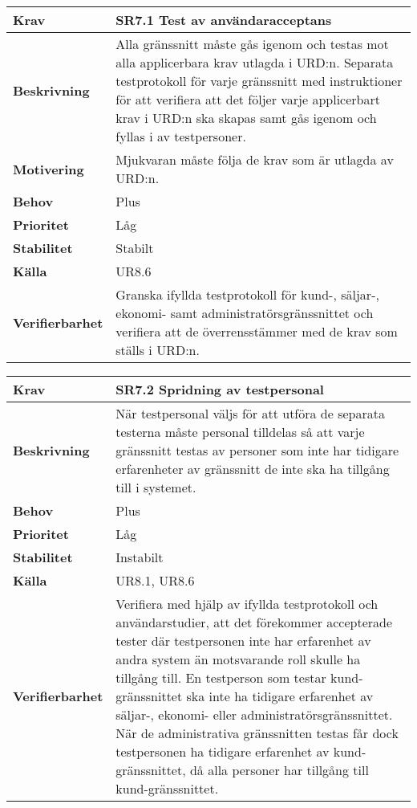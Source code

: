 \documentclass[a4paper, twoside, 11pt, titlepage]{article}
\begin{document}
	\begin {table} [ht] \begin{tabular} { p{2.6cm} p{12.5cm} }
		\hline
		\sffamily\textbf{Krav} & \sffamily\textbf{SR7.1 Test av användaracceptans } \\
		\hline
		\sffamily\textbf{Beskrivning} & Alla gränssnitt måste gås igenom och testas mot alla applicerbara krav utlagda i URD:n. Separata testprotokoll för varje gränssnitt med instruktioner för att verifiera att det följer varje applicerbart krav i URD:n ska skapas samt gås igenom och fyllas i av testpersoner.  \\
		\hline
		\sffamily\textbf{Motivering} & Mjukvaran måste följa de krav som är utlagda av URD:n.  \\
		\hline
		\sffamily\textbf{Behov} & Plus  \\
		\hline
		\sffamily\textbf{Prioritet} & Låg  \\
		\hline
		\sffamily\textbf{Stabilitet} & Stabilt  \\
		\hline
		\sffamily\textbf{Källa} & UR8.6  \\
		\hline
		\sffamily\textbf{Verifierbarhet} & Granska ifyllda testprotokoll för kund-, säljar-, ekonomi- samt administratörsgränssnittet och verifiera att de överrensstämmer med de krav som ställs i URD:n.  \\
		\hline
	\end{tabular} \end{table} \FloatBarrier
	\vspace{6mm}

	\begin {table} [ht] \begin{tabular} { p{2.6cm} p{12.5cm} }
		\hline
		\sffamily\textbf{Krav} & \sffamily\textbf{SR7.2 Spridning av testpersonal } \\
		\hline
		\sffamily\textbf{Beskrivning} & När testpersonal väljs för att utföra de separata testerna måste personal tilldelas så att varje gränssnitt testas av personer som inte har tidigare erfarenheter av gränssnitt de inte ska ha tillgång till i systemet.  \\
		\hline
		\sffamily\textbf{Behov} & Plus  \\
		\hline
		\sffamily\textbf{Prioritet} & Låg  \\
		\hline
		\sffamily\textbf{Stabilitet} & Instabilt  \\
		\hline
		\sffamily\textbf{Källa} & UR8.1, UR8.6  \\
		\hline
		\sffamily\textbf{Verifierbarhet} & Verifiera med hjälp av ifyllda testprotokoll och användarstudier, att det förekommer accepterade tester där testpersonen inte har erfarenhet av andra system än motsvarande roll skulle ha tillgång till.  En testperson som testar kund-gränssnittet ska inte ha tidigare erfarenhet av säljar-, ekonomi- eller administratörsgränssnittet. När de administrativa gränssnitten testas får dock  testpersonen ha tidigare erfarenhet av kund-gränssnittet, då alla personer har tillgång till kund-gränssnittet.  \\
		\hline
	\end{tabular} \end{table} \FloatBarrier
\end{document}
